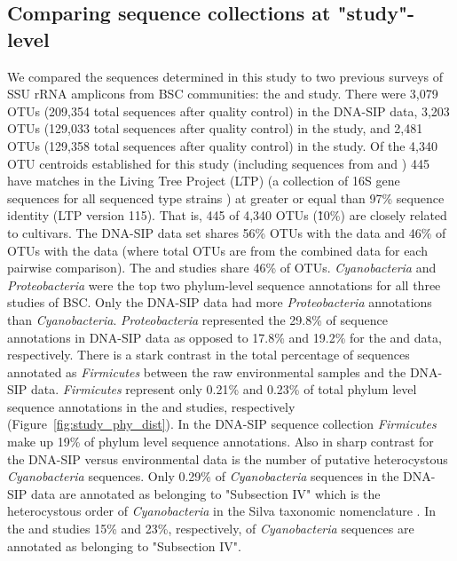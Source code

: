 \subsection{Comparing sequence collections at "study"-level}
We compared the sequences determined in this study to two previous surveys of
SSU rRNA amplicons from BSC communities: the \citet{Garcia_Pichel_2013}
and \citet{Steven_2013} study. There were 3,079 OTUs (209,354 total sequences
after quality control) in the DNA-SIP data, 3,203 OTUs (129,033 total sequences
after quality control) in the \citet{Garcia_Pichel_2013} study, and 2,481 OTUs
(129,358 total sequences after quality control) in the \citet{Steven_2013}
study. Of the 4,340 OTU centroids established for this study (including
sequences from \citet{Steven_2013} and \citet{Garcia_Pichel_2013}) 445 have
matches in the Living Tree Project (LTP) (a collection of 16S gene sequences
for all sequenced type strains \citep{Yarza_2008}) at greater or equal than
97\% sequence identity (LTP version 115). That is, 445 of 4,340 OTUs (\~10\%)
are closely related to cultivars. The DNA-SIP data set shares 56\% OTUs with
the \citet{Steven_2013} data and 46\% of OTUs with the
\citet{Garcia_Pichel_2013} data (where total OTUs are from the combined data
for each pairwise comparison).  The \citet{Steven_2013} and
\citet{Garcia_Pichel_2013} studies share 46\% of OTUs. \textit{Cyanobacteria}
and \textit{Proteobacteria} were the top two phylum-level sequence annotations
for all three studies of BSC. Only the DNA-SIP data had more
\textit{Proteobacteria} annotations than \textit{Cyanobacteria}.
\textit{Proteobacteria} represented the 29.8\% of sequence annotations in
DNA-SIP data as opposed to 17.8\% and 19.2\% for the \citet{Garcia_Pichel_2013}
and \citet{Steven_2013} data, respectively.  There is a stark contrast in the
total percentage of sequences annotated as \textit{Firmicutes} between the raw
environmental samples and the DNA-SIP data.  \textit{Firmicutes} represent only
0.21\% and 0.23\% of total phylum level sequence annotations in the
\citet{Steven_2013} and \citet{Garcia_Pichel_2013} studies, respectively
(Figure~\ref{fig:study_phy_dist}). In the DNA-SIP sequence collection
\textit{Firmicutes} make up 19\% of phylum level sequence annotations. Also in
sharp contrast for the DNA-SIP versus environmental data is the number of
putative heterocystous \textit{Cyanobacteria} sequences. Only 0.29\% of
\textit{Cyanobacteria} sequences in the DNA-SIP data are annotated as belonging
to "Subsection IV" which is the heterocystous order of \textit{Cyanobacteria}
in the Silva taxonomic nomenclature \citep{17947321}. In the
\citet{Steven_2013} and \citet{Garcia_Pichel_2013} studies 15\% and 23\%,
respectively, of \textit{Cyanobacteria} sequences are annotated as belonging to
"Subsection
IV".  

